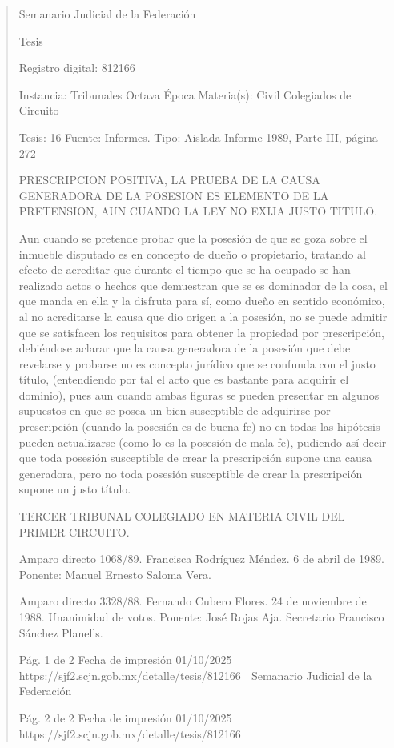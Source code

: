 \documentclass[11pt,a4paper]{article}
\begin{document}
\begin{quote}
                                                   Semanario Judicial de la Federación

                                                  Tesis

 Registro digital: 812166

 Instancia: Tribunales            Octava Época                          Materia(s): Civil
 Colegiados de Circuito

 Tesis: 16                        Fuente: Informes.                     Tipo: Aislada
                                  Informe 1989, Parte III, página 272


PRESCRIPCION POSITIVA, LA PRUEBA DE LA CAUSA GENERADORA DE LA POSESION ES
ELEMENTO DE LA PRETENSION, AUN CUANDO LA LEY NO EXIJA JUSTO TITULO.


Aun cuando se pretende probar que la posesión de que se goza sobre el inmueble disputado es en
concepto de dueño o propietario, tratando al efecto de acreditar que durante el tiempo que se ha
ocupado se han realizado actos o hechos que demuestran que se es dominador de la cosa, el que
manda en ella y la disfruta para sí, como dueño en sentido económico, al no acreditarse la causa
que dio origen a la posesión, no se puede admitir que se satisfacen los requisitos para obtener la
propiedad por prescripción, debiéndose aclarar que la causa generadora de la posesión que debe
revelarse y probarse no es concepto jurídico que se confunda con el justo título, (entendiendo por tal
el acto que es bastante para adquirir el dominio), pues aun cuando ambas figuras se pueden
presentar en algunos supuestos en que se posea un bien susceptible de adquirirse por prescripción
(cuando la posesión es de buena fe) no en todas las hipótesis pueden actualizarse (como lo es la
posesión de mala fe), pudiendo así decir que toda posesión susceptible de crear la prescripción
supone una causa generadora, pero no toda posesión susceptible de crear la prescripción supone
un justo título.

TERCER TRIBUNAL COLEGIADO EN MATERIA CIVIL DEL PRIMER CIRCUITO.


Amparo directo 1068/89. Francisca Rodríguez Méndez. 6 de abril de 1989. Ponente: Manuel
Ernesto Saloma Vera.

Amparo directo 3328/88. Fernando Cubero Flores. 24 de noviembre de 1988. Unanimidad de votos.
Ponente: José Rojas Aja. Secretario Francisco Sánchez Planells.




                                             Pág. 1 de 2             Fecha de impresión 01/10/2025
  https://sjf2.scjn.gob.mx/detalle/tesis/812166
                                                Semanario Judicial de la Federación




                                           Pág. 2 de 2       Fecha de impresión 01/10/2025
https://sjf2.scjn.gob.mx/detalle/tesis/812166

\end{quote}
\end{document}
